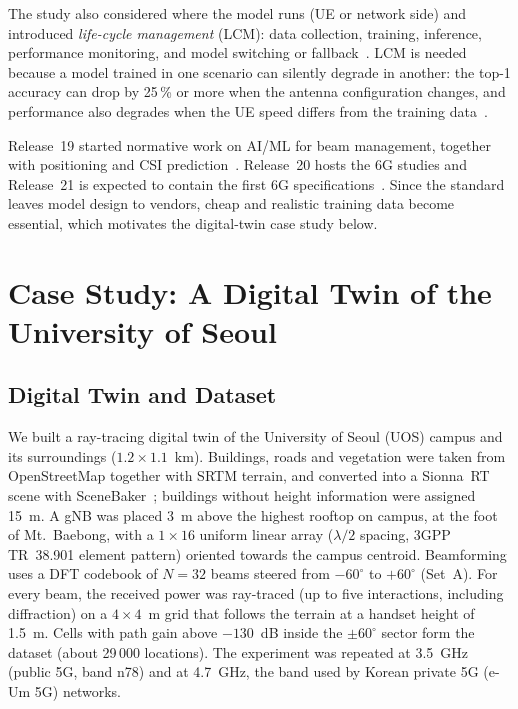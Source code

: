 \documentclass[journal]{IEEEtran}
\begin{document}
The study also considered where the model runs (UE or network side) and introduced \emph{life-cycle management} (LCM): data collection, training, inference, performance monitoring, and model switching or fallback~\cite{xue2023standard,gao2026rel19}. LCM is needed because a model trained in one scenario can silently degrade in another: the top-1 accuracy can drop by 25\,\% or more when the antenna configuration changes, and performance also degrades when the UE speed differs from the training data~\cite{jayaweera2024bm}.

Release~19 started normative work on AI/ML for beam management, together with positioning and CSI prediction~\cite{3gppRel19,gao2026rel19}. Release~20 hosts the 6G studies and Release~21 is expected to contain the first 6G specifications~\cite{3gppRel19}. Since the standard leaves model design to vendors, cheap and realistic training data become essential, which motivates the digital-twin case study below.

\section{Case Study: A Digital Twin of the University of Seoul}
\label{sec:case}

\subsection{Digital Twin and Dataset}
We built a ray-tracing digital twin of the University of Seoul (UOS) campus and its surroundings ($1.2\times1.1$~km). Buildings, roads and vegetation were taken from OpenStreetMap together with SRTM terrain, and converted into a Sionna~RT scene with SceneBaker~\cite{lyu2026scenebaker,hoydis2023sionnart}; buildings without height information were assigned 15~m. A gNB was placed 3~m above the highest rooftop on campus, at the foot of Mt.~Baebong, with a $1\times16$ uniform linear array ($\lambda/2$ spacing, 3GPP TR~38.901 element pattern) oriented towards the campus centroid. Beamforming uses a DFT codebook of $N=32$ beams steered from $-60^\circ$ to $+60^\circ$ (Set~A). For every beam, the received power was ray-traced (up to five interactions, including diffraction) on a $4\times4$~m grid that follows the terrain at a handset height of 1.5~m. Cells with path gain above $-130$~dB inside the $\pm60^\circ$ sector form the dataset (about 29\,000 locations). The experiment was repeated at 3.5~GHz (public 5G, band n78) and at 4.7~GHz, the band used by Korean private 5G (e-Um 5G) networks.
\end{document}
